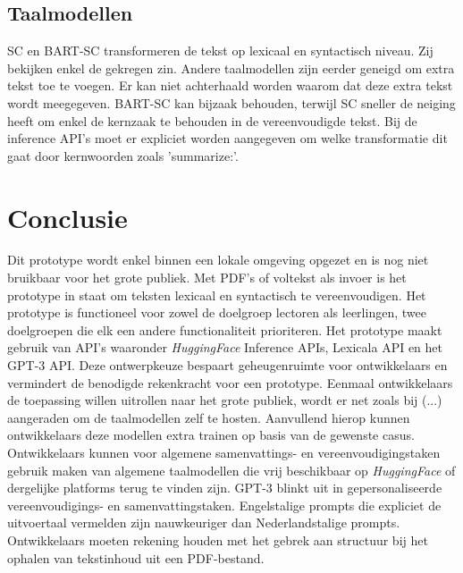 \subsection{Taalmodellen}

SC en BART-SC transformeren de tekst op lexicaal en syntactisch niveau. Zij bekijken enkel de gekregen zin. Andere taalmodellen zijn eerder geneigd om extra tekst toe te voegen. Er kan niet achterhaald worden waarom dat deze extra tekst wordt meegegeven. BART-SC kan bijzaak behouden, terwijl SC sneller de neiging heeft om enkel de kernzaak te behouden in de vereenvoudigde tekst. Bij de inference API's moet er expliciet worden aangegeven om welke transformatie dit gaat door kernwoorden zoals 'summarize:'.

\section{Conclusie}

Dit prototype wordt enkel binnen een lokale omgeving opgezet en is nog niet bruikbaar voor het grote publiek. Met PDF's of voltekst als invoer is het prototype in staat om teksten lexicaal en syntactisch te vereenvoudigen. Het prototype is functioneel voor zowel de doelgroep lectoren als leerlingen, twee doelgroepen die elk een andere functionaliteit prioriteren. Het prototype maakt gebruik van API's waaronder \textit{HuggingFace} Inference APIs, Lexicala API en het GPT-3 API. Deze ontwerpkeuze bespaart geheugenruimte voor ontwikkelaars en vermindert de benodigde rekenkracht voor een prototype. Eenmaal ontwikkelaars de toepassing willen uitrollen naar het grote publiek, wordt er net zoals bij (...) aangeraden om de taalmodellen zelf te hosten. Aanvullend hierop kunnen ontwikkelaars deze modellen extra trainen op basis van de gewenste casus. Ontwikkelaars kunnen voor algemene samenvattings- en vereenvoudigingstaken gebruik maken van algemene taalmodellen die vrij beschikbaar op \textit{HuggingFace} of dergelijke platforms terug te vinden zijn. GPT-3 blinkt uit in gepersonaliseerde vereenvoudigings- en samenvattingstaken. Engelstalige prompts die expliciet de uitvoertaal vermelden zijn nauwkeuriger dan Nederlandstalige prompts. Ontwikkelaars moeten rekening houden met het gebrek aan structuur bij het ophalen van tekstinhoud uit een PDF-bestand.
